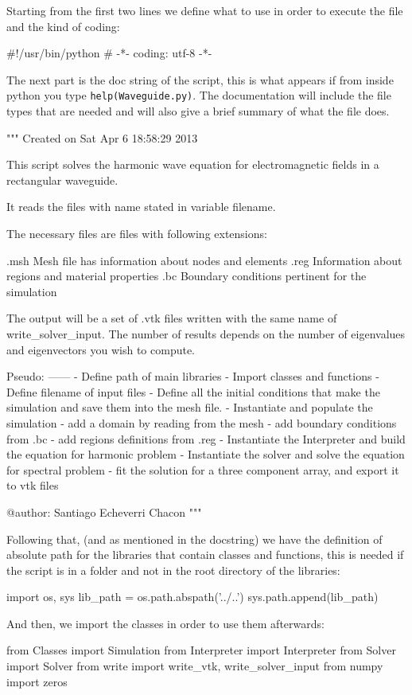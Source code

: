 Starting from the first two lines we define what to use in order to execute the file and the kind of coding:
\begin{python}[language=python]
#!/usr/bin/python
# -*- coding: utf-8 -*-
\end{python}

The next part is the doc string of the script, this is what appears if from inside python you type \verb|help(Waveguide.py)|. The documentation will include the file types that are needed and will also give a brief summary of what the file does.

\begin{python}[language=python]
"""
Created on Sat Apr  6 18:58:29 2013

This script solves the harmonic wave equation for electromagnetic fields in 
a rectangular waveguide.

It reads the files with name stated in variable filename.

The necessary files are files with following extensions:
    
    .msh    Mesh file has information about nodes and elements
    .reg    Information about regions and material properties
    .bc     Boundary conditions pertinent for the simulation

The output will be a set of .vtk files written with the same name of write_solver_input.
The number of results depends on the number of eigenvalues and eigenvectors you wish
to compute.

Pseudo:
------
 - Define path of main libraries
 - Import classes and functions 
 - Define filename of input files
 - Define all the initial conditions that make the simulation and save them 
    into the mesh file.
- Instantiate and populate the simulation
    - add a domain by reading from the mesh
    - add boundary conditions from .bc
    - add regions definitions from .reg
- Instantiate  the Interpreter and build the equation for harmonic problem
- Instantiate the solver and solve the equation for spectral problem
- fit the solution for a three component array, and export it to vtk files

@author: Santiago Echeverri Chacon
"""
\end{python}

Following that, (and as mentioned in the docstring) we have the definition 
of absolute path for the libraries that contain classes and functions, this is needed if the script is in a folder and not in the root directory of the libraries:
\begin{python}
import os, sys
lib_path = os.path.abspath('../..')
sys.path.append(lib_path)
\end{python}
And then, we import the classes in order to use them afterwards:
\begin{python}
from Classes import Simulation
from Interpreter import Interpreter
from Solver import Solver
from write import write_vtk, write_solver_input 
from numpy import zeros
\end{python}

